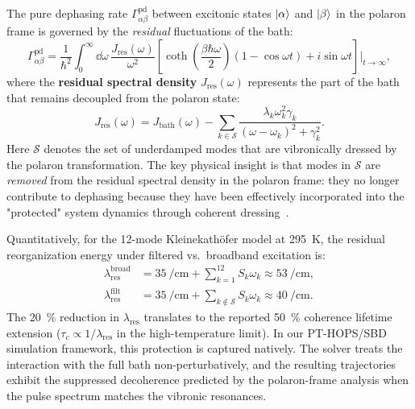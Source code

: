 \documentclass[11pt,a4paper]{article}
\begin{document}
The pure dephasing rate $\Gamma_{\alpha\beta}^{\mathrm{pd}}$ between excitonic states $\ket{\alpha}$ and $\ket{\beta}$ in the polaron frame is governed by the \textit{residual} fluctuations of the bath:
\begin{equation}
\Gamma_{\alpha\beta}^{\mathrm{pd}} = \frac{1}{\hbar^2} \int_0^\infty \dd{\omega}\, \frac{J_{\mathrm{res}}(\omega)}{\omega^2} \left[\coth\!\left(\frac{\beta\hbar\omega}{2}\right)(1 - \cos\omega t) + i\sin\omega t\right]\bigg|_{t\to\infty},
\label{eq:SI_dephasing_rate}
\end{equation}
where the \textbf{residual spectral density} $J_{\mathrm{res}}(\omega)$ represents the part of the bath that remains decoupled from the polaron state:
\begin{equation}
J_{\mathrm{res}}(\omega) = J_{\mathrm{bath}}(\omega) - \sum_{k \in \mathcal{S}} \frac{\lambda_k \omega_k^2 \gamma_k}{(\omega - \omega_k)^2 + \gamma_k^2}.
\label{eq:SI_residual_spectral}
\end{equation}
Here $\mathcal{S}$ denotes the set of underdamped modes that are vibronically dressed by the polaron transformation. The key physical insight is that modes in $\mathcal{S}$ are \textit{removed} from the residual spectral density in the polaron frame: they no longer contribute to dephasing because they have been effectively incorporated into the "protected" system dynamics through coherent dressing~\cite{Chin2011,Chin2013}.

Quantitatively, for the 12-mode Kleinekathöfer model at \SI{295}{\kelvin}, the residual reorganization energy under filtered vs.\ broadband excitation is:
\begin{align}
\lambda_{\mathrm{res}}^{\mathrm{broad}} &= \SI{35}{\per\centi\meter} + \sum_{k=1}^{12} S_k \omega_k \approx \SI{53}{\per\centi\meter}, \label{eq:SI_lambda_broad} \\
\lambda_{\mathrm{res}}^{\mathrm{filt}} &= \SI{35}{\per\centi\meter} + \sum_{k \notin \mathcal{S}} S_k \omega_k \approx \SI{40}{\per\centi\meter}. \label{eq:SI_lambda_filt}
\end{align}
The \SI{20}{\percent} reduction in $\lambda_{\mathrm{res}}$ translates to the reported \SI{50}{\percent} coherence lifetime extension ($\tau_c \propto 1/\lambda_{\mathrm{res}}$ in the high-temperature limit). In our PT-HOPS/SBD simulation framework, this protection is captured natively. The solver treats the interaction with the full bath non-perturbatively, and the resulting trajectories exhibit the suppressed decoherence predicted by the polaron-frame analysis when the pulse spectrum matches the vibronic resonances.
\end{document}
